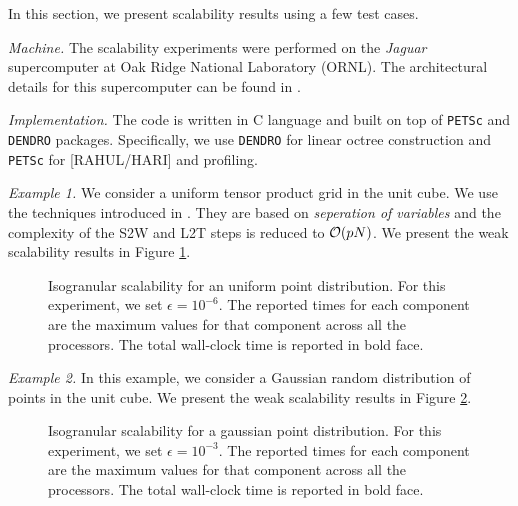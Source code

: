 In this section, we present scalability results using a few test cases.  

{\em Machine.} The scalability experiments were performed on the {\it{Jaguar}} supercomputer at Oak Ridge National Laboratory (ORNL). The architectural details for this supercomputer can be found in \cite{jaguar}.

{\em Implementation.} The code is written in C language and built on top of \texttt{PETSc} and \texttt{DENDRO} packages. Specifically, we use \texttt{DENDRO} for linear octree construction and \texttt{PETSc} for [RAHUL/HARI] and profiling. 

{\em Example 1.} We consider a uniform tensor product grid in the unit cube. We use the techniques introduced in \cite{fggt}. They are based on {\em seperation of variables} and the complexity of the S2W and L2T steps is reduced to $\mathcal{O}(p N)$. We present the weak scalability results in Figure \ref{fig:uniform}. 

\begin{figure}
	\begin{center}
	
	\end{center}
\caption{\label{f:isoUniform} Isogranular scalability for an uniform point distribution. For
 this experiment, we set $\epsilon = 10^{-6}$. The reported times for 
each component are the maximum values for that component across all the processors. The total wall-clock
time is reported in bold face.} \label{fig:uniform}
\end{figure}

{\em Example 2.} In this example, we consider a Gaussian random distribution of points in the unit cube. 
We present the weak scalability results in Figure \ref{fig:nonuniform}. 

\begin{figure}
	\begin{center}
	
	\end{center}
\caption{\label{f:isoGaussian} Isogranular scalability for a gaussian point distribution. For
 this experiment, we set $\epsilon = 10^{-3}$. The reported times for each component are the
 maximum values for that component across all the processors. The total wall-clock
time is reported in bold face.} \label{fig:nonuniform}
\end{figure}
